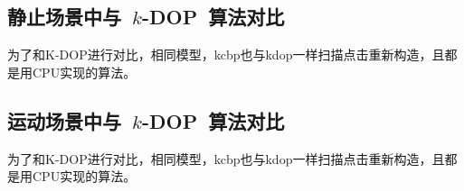 \subsection{静止场景中与~$k$-DOP~算法对比}
\label{subsec:exper:kdop:kcbp:static}

为了和K-DOP进行对比，相同模型，kcbp也与kdop一样扫描点击重新构造，且都是用CPU实现的算法。


\subsection{运动场景中与~$k$-DOP~算法对比}
\label{subsec:exper:kdop:kcbp:dynamic}

为了和K-DOP进行对比，相同模型，kcbp也与kdop一样扫描点击重新构造，且都是用CPU实现的算法。
